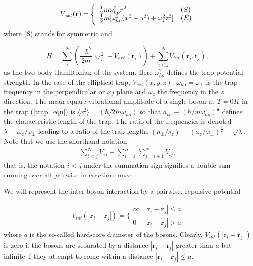 \documentclass[%
oneside,                 %
final,                   %
10pt]{article}
\begin{document}
\begin{equation}
 V_{ext}(\mathbf{r}) = 
 \Bigg\{
 \begin{array}{ll}
	 \frac{1}{2}m\omega_{ho}^2r^2 & (S)\\
 \strut
	 \frac{1}{2}m[\omega_{ho}^2(x^2+y^2) + \omega_z^2z^2] & (E)
 \label{trap_eqn}
 \end{array}
 \end{equation}
 where (S) stands for symmetric and

\begin{equation}
     H = \sum_i^N \left(\frac{-\hbar^2}{2m}{\bigtriangledown }_{i}^2 +V_{ext}({\mathbf{r}}_i)\right)  +
	 \sum_{i<j}^{N} V_{int}({\mathbf{r}}_i,{\mathbf{r}}_j),
 \end{equation}
 as the two-body Hamiltonian of the system.  Here $\omega_{ho}^2$
 defines the trap potential strength.  In the case of the elliptical
 trap, $V_{ext}(x,y,z)$, $\omega_{ho}=\omega_{\perp}$ is the trap
 frequency in the perpendicular or $xy$ plane and $\omega_z$ the
 frequency in the $z$ direction.  The mean square vibrational
 amplitude of a single boson at $T=0K$ in the trap (\ref{trap_eqn}) is
 $\langle x^2\rangle=(\hbar/2m\omega_{ho})$ so that $a_{ho} \equiv
 (\hbar/m\omega_{ho})^{\frac{1}{2}}$ defines the characteristic length
 of the trap.  The ratio of the frequencies is denoted
 $\lambda=\omega_z/\omega_{\perp}$ leading to a ratio of the trap
 lengths $(a_{\perp}/a_z)=(\omega_z/\omega_{\perp})^{\frac{1}{2}} =
 \sqrt{\lambda}$. Note that we use the shorthand notation
\begin{align}
    \sum_{i < j}^{N} V_{ij} \equiv \sum_{i = 1}^{N}\sum_{j = i + 1}^{N} V_{ij},
\end{align}
 that is, the notation $i < j$ under the summation sign signifies a double sum
 running over all pairwise interactions once.

 We will represent the inter-boson interaction by a pairwise,
 repulsive potential

\begin{equation}
 V_{int}(|\mathbf{r}_i-\mathbf{r}_j|) =  \Bigg\{
 \begin{array}{ll}
	 \infty & {|\mathbf{r}_i-\mathbf{r}_j|} \leq {a}\\
	 0 & {|\mathbf{r}_i-\mathbf{r}_j|} > {a}
 \end{array}
 \end{equation}
 where $a$ is the so-called hard-core diameter of the bosons.
 Clearly, $V_{int}(|\mathbf{r}_i-\mathbf{r}_j|)$ is zero if the bosons are
 separated by a distance $|\mathbf{r}_i-\mathbf{r}_j|$ greater than $a$ but
 infinite if they attempt to come within a distance $|\mathbf{r}_i-\mathbf{r}_j| \leq a$.
\end{document}
